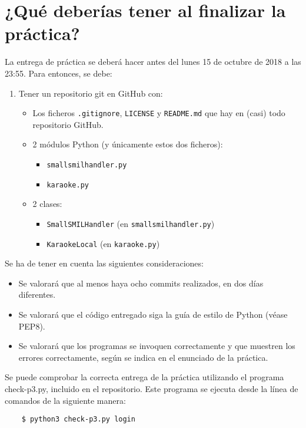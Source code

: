\documentclass[11pt,a4paper]{article}
\begin{document}
\section{¿Qué deberías tener al finalizar la práctica?}

La entrega de práctica se deberá hacer antes del lunes 15 de octubre de 2018 a las 23:55. Para entonces, se debe: 

\begin{enumerate}
  \item Tener un repositorio git en GitHub con:
  \begin{itemize}
    \item Los ficheros \texttt{.gitignore}, \texttt{LICENSE} y \texttt{README.md} que hay en (casi) todo repositorio GitHub.
    \item 2 módulos Python (y únicamente estos dos ficheros):
    \begin{itemize}
      \item \texttt{smallsmilhandler.py}
      \item \texttt{karaoke.py}
    \end{itemize}
    \item 2 clases:
    \begin{itemize}
      \item \texttt{SmallSMILHandler} (en \texttt{smallsmilhandler.py})
      \item \texttt{KaraokeLocal} (en \texttt{karaoke.py})
    \end{itemize}
  \end{itemize}
\end{enumerate}

Se ha de tener en cuenta las siguientes consideraciones:
\begin{itemize}
  \item Se valorará que al menos haya ocho commits realizados, en dos días diferentes.
  \item Se valorará que el código entregado siga la guía de estilo de Python (véase PEP8).
  \item Se valorará que los programas se invoquen correctamente y que muestren los errores correctamente, según se indica en el enunciado de la práctica.
\end{itemize}

Se puede comprobar la correcta entrega de la práctica utilizando el programa check-p3.py, incluido en el repositorio. Este programa se ejecuta desde la línea de comandos de la siguiente manera:
\begin{verbatim}
	$ python3 check-p3.py login
\end{verbatim}
\end{document}
